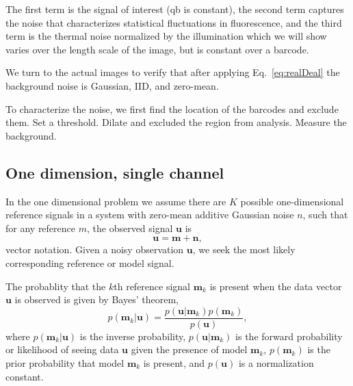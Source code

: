 The first term is the signal of interest  (qb is constant), the second term  captures the noise that characterizes statistical fluctuations in fluorescence, and the third term is the thermal noise normalized by the illumination which we will show varies over the length scale of the image, but is constant over a barcode.


We turn to the actual images to verify that after applying Eq.~\ref{eq:realDeal} the background noise is Gaussian, IID, and zero-mean.

To characterize the noise, we first find the location of the barcodes and exclude them. 
Set a threshold. Dilate and excluded the region from analysis. Measure the background.


\subsection{One dimension, single channel}
In the one dimensional problem we assume there are $K$ possible one-dimensional reference signals in a system with zero-mean additive Gaussian noise $n$, such that for any reference $m$, the observed signal $\mathbf{u}$ is
\begin{equation}
\mathbf{u}=\mathbf{m} + \mathbf{n},
\end{equation}
vector notation. Given a noisy observation $\mathbf{u}$, we seek the most likely corresponding reference or model signal. 



The probablity that the $k$th reference signal $\mathbf{m}_k$ is present when the data vector $\mathbf{u}$ is observed is given by Bayes' theorem,
\begin{equation}\label{eq:Bayes}
p(\mathbf{m}_k|\mathbf{u}) = \frac{p(\mathbf{u}|\mathbf{m}_k)p(\mathbf{m}_k)} {p(\mathbf{u})},
\end{equation}
where $p(\mathbf{m}_k|\mathbf{u})$ is the inverse probability, $p(\mathbf{u}|\mathbf{m}_k)$ is the forward probability or likelihood of seeing data $\mathbf{u}$ given the presence of model $\mathbf{m}_k$, $p(\mathbf{m}_k)$ is the prior probability that model $\mathbf{m}_k$ is present, and $p(\mathbf{u})$ is a normalization constant.

